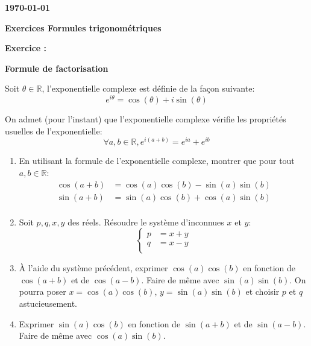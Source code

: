 \documentclass[a4paper,12pt]{article}
\def\Exam{Exercices \og Formules trigonométriques\fg{}}
\def\Date{\today}
\begin{document}
\setcounter{nexo}{1}
\newcommand{\Exo}{\medskip
  {\bf Exercice \arabic{nexo} : }
  \addtocounter{nexo}{1}}
\newcommand{\Pb}{{\bf Problème \arabic{nexo} : } 
\addtocounter{nexo}{1} \bigskip}
{\bf  \hfill \Date \quad ~}
%
\vskip 1cm
%
\centerline{\bf \LARGE \Exam}
%
\vskip 1.5cm
%




\Exo \textbf{Formule de factorisation}

Soit $\theta \in \mathbb{R}$, l'exponentielle complexe est définie de la façon suivante:
\begin{equation*}
e^{i\theta} = \cos(\theta) + i \sin(\theta)
\end{equation*}

On admet (pour l'instant) que l'exponentielle complexe vérifie les propriétés usuelles de l'exponentielle:
\begin{equation*}
\forall a, b \in \mathbb{R}, e^{i(a+b)} = e^{ia} + e^{ib}
\end{equation*}


\begin{enumerate}
\item En utilisant la formule de l'exponentielle complexe, montrer que pour tout $a,b \in \mathbb{R}$: 
  \begin{align*}
    \cos(a+b) & = \cos(a)\cos(b) - \sin(a)\sin(b) \\
    \sin(a+b) & = \sin(a)\cos(b) + \cos(a)\sin(b) \\
  \end{align*}
\item Soit $p, q, x, y$ des réels. Résoudre le système d'inconnues $x$ et $y$:
  \begin{equation*}
    \begin{cases}
      p & = x + y \\
      q & = x - y \\
    \end{cases}
  \end{equation*}
\item À l'aide du système précédent, exprimer $\cos(a)\cos(b)$ en fonction de $\cos(a+b)$ et de $\cos(a-b)$. Faire de même avec $\sin(a)\sin(b)$. On pourra poser $x = \cos(a)\cos(b)$, $y = \sin(a)\sin(b)$ et choisir $p$ et $q$ astucieusement. 
\item Exprimer $\sin(a)\cos(b)$ en fonction de $\sin(a+b)$ et de $\sin(a-b)$. Faire de même avec $\cos(a)\sin(b)$. 
\end{enumerate}
\end{document}
